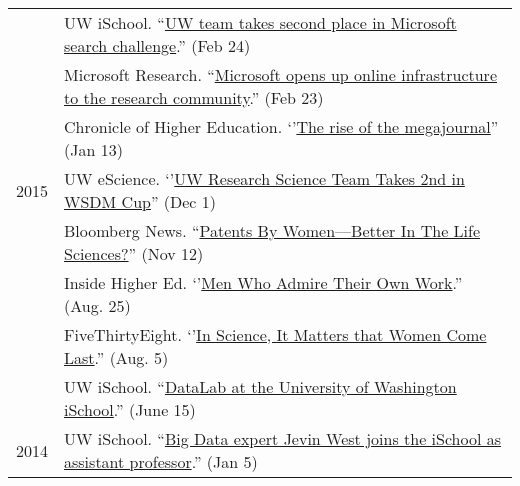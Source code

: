 \documentclass[11pt]{article}
\begin{document}
\begin{longtable}{p{0.5in}|p{5.5in}}
        & UW iSchool. ``\href{https://ischool.uw.edu/news/2016/02/uw-team-takes-second-place-microsoft-search-challenge}{UW team takes second place in Microsoft search challenge}.'' (Feb 24) \\
        & Microsoft Research. ``\href{https://blogs.msdn.microsoft.com/msr_er/2016/02/23/microsoft-opens-up-online-infrastructure-to-the-research-community/}{Microsoft opens up online infrastructure to the research community}.'' (Feb 23) \\
        & Chronicle of Higher Education. `'\href{http://chronicle.com/article/As-an-Open-Access-Megajournal/234890/?key=V9WzHg4QbDkFuXONne07CiwpC5cgiOVgA5_Vr92e1bNrUktRMEhhLXpCT3hONUR3VHN1VWdLUk5ZdFVJUENKVFNWdkpscWJvWmFn}{The rise of the megajournal}'' (Jan 13) \\
  2015  & UW eScience. `'\href{http://escience.washington.edu/uw-research-science-team-takes-2nd-in-wsdm-cup/}{UW Research Science Team Takes 2nd in WSDM Cup}'' (Dec 1) \\
  		& Bloomberg News. ``\href{http://www.bna.com/patents-womenbetter-life-b57982063501/}{Patents By Women—Better In The Life Sciences?}'' (Nov 12) \\
  		  & Inside Higher Ed. `'\href{https://www.insidehighered.com/news/2015/08/25/study-finds-men-are-more-likely-women-engage-self-citation}{Men Who Admire Their Own Work}.'' (Aug. 25) \\
        & FiveThirtyEight. `'\href{http://fivethirtyeight.com/features/in-science-it-matters-that-women-come-last/}{In Science, It Matters that Women Come Last}.'' (Aug. 5) \\
        & UW iSchool. ``\href{https://ischool.uw.edu/videos/datalab-ischool}{DataLab at the University of Washington iSchool}.'' (June 15) \\
  2014  & UW iSchool. ``\href{https://ischool.uw.edu/feature-stories/big-data-expert-jevin-west-joins-ischool-assistant-professor}{Big Data expert Jevin West joins the iSchool as assistant professor}.'' (Jan 5) \\
        
\end{longtable}









\end{document}

